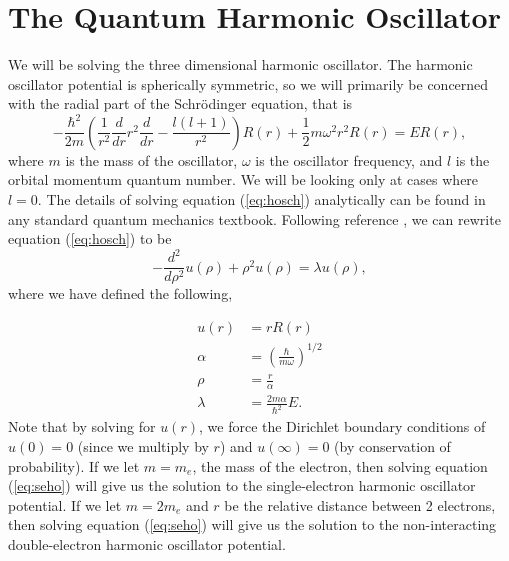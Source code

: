 \documentclass[a4paper,12pt]{report}
\begin{document}
\section{The Quantum Harmonic Oscillator}\label{sec:ho}
We will be solving the three dimensional harmonic oscillator. The harmonic oscillator potential is spherically symmetric, so we will primarily be concerned with the radial part of the Schr\"odinger equation, that is
\begin{equation}\label{eq:hosch}
 -\frac{\hbar^2}{2m}\left(\frac{1}{r^2}\frac{d}{dr}r^2\frac{d}{dr} - \frac{l(l+1)}{r^2} \right)R(r)+\frac{1}{2}m\omega^2 r^2 R(r)= ER(r),
\end{equation}
where $m$ is the mass of the oscillator, $\omega$ is the oscillator frequency, and $l$ is the orbital momentum quantum number. We will be looking only at cases where $l = 0$. The details of solving equation (\ref{eq:hosch}) analytically can be found in any standard quantum mechanics textbook. Following reference \cite{dux:2016}, we can rewrite equation (\ref{eq:hosch}) to be
\begin{equation}\label{eq:seho}
 -\frac{d^2}{d\rho^2}u(\rho) + \rho^2 u(\rho) = \lambda u(\rho),
\end{equation}
where we have defined the following,

 \begin{align*}
  u(r) &= rR(r) \\
  \alpha &= \left(\frac{\hbar}{m\omega} \right)^{1/2} \\ 
  \rho &= \frac{r}{\alpha} \\
  \lambda &= \frac{2m\alpha}{\hbar^2}E.
 \end{align*}
Note that by solving for $u(r)$, we force the Dirichlet boundary conditions of $u(0) = 0$ (since we multiply by $r$) and $u(\infty) = 0$ (by conservation of probability). If we let $m = m_e$, the mass of the electron, then solving equation (\ref{eq:seho}) will give us the solution to the single-electron harmonic oscillator potential. If we let $m = 2m_e$ and $r$ be the relative distance between 2 electrons, then solving equation (\ref{eq:seho}) will give us the solution to the non-interacting double-electron harmonic oscillator potential. 
\end{document}
